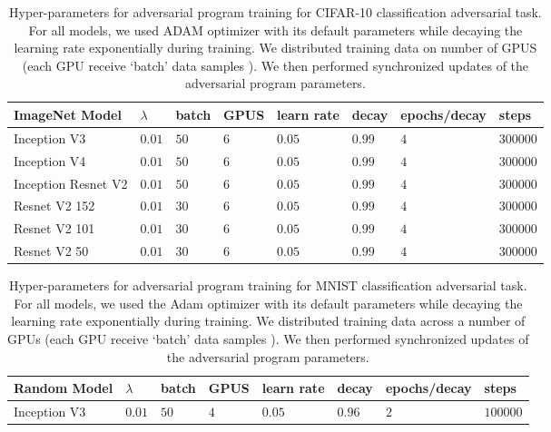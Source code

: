 \documentclass{article}
\begin{document}
\begin{table}
\begin{tabular}{llllllll}
    \bottomrule
  \end{tabular}
\end{table}\begin{table}
  \caption{Hyper-parameters for adversarial program training for CIFAR-10 classification adversarial task. For all models, we used ADAM optimizer with its default parameters while decaying the learning rate exponentially during training.  We distributed training data on number of GPUS (each GPU receive `batch' data samples ). We then performed synchronized updates of the adversarial program parameters.}
  \label{table: hyperparams cifar}
  \centering
  \begin{tabular}{llllllll}
    \toprule
     ImageNet Model &  $\lambda$ & batch & GPUS & learn rate & decay & epochs/decay & steps \\
     \midrule
    Inception V3                 & $0.01$ & $50$  & $6$  &  $0.05$ & $0.99$ & $4$ & $300000$  \\
    Inception V4                & $0.01$ & $50$  & $6$  &  $0.05$ & $0.99$ & $4$ & $300000$  \\
    Inception Resnet V2    & $0.01$ & $50$  & $6$  &  $0.05$ & $0.99$ & $4$ & $300000$  \\
    Resnet V2 152            & $0.01$ & $30$  & $6$  &  $0.05$ & $0.99$ & $4$ & $300000$  \\
    Resnet V2 101           & $0.01$ & $30$  & $6$  &  $0.05$ & $0.99$ & $4$ & $300000$  \\
    Resnet V2 50           & $0.01$ & $30$  & $6$  &  $0.05$ & $0.99$ & $4$ & $300000$  \\
    \bottomrule
  \end{tabular}
\end{table}\begin{table}
  \caption{Hyper-parameters for adversarial program training for MNIST classification adversarial task. For all models, we used the Adam optimizer with its default parameters while decaying the learning rate exponentially during training.  We distributed training data across a number of GPUs (each GPU receive `batch' data samples ). We then performed synchronized updates of the adversarial program parameters.}
  \label{table: hyperparams mnist random}
  \centering
  \begin{tabular}{llllllll}
    \toprule
     Random Model &  $\lambda$ & batch & GPUS & learn rate & decay & epochs/decay & steps \\
     \midrule
    Inception V3                 & $0.01$ & $50$  & $4$  &  $0.05$ & $0.96$ & $2$ & $100000$  \\

\end{tabular}
\end{table}
\end{document}
